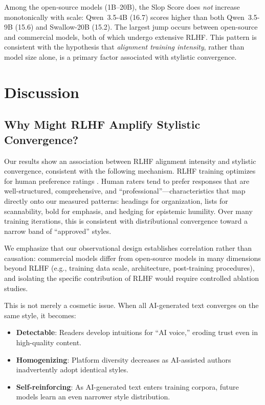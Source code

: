 \documentclass[11pt,a4paper]{article}
\begin{document}
Among the open-source models (1B--20B), the Slop Score does \textit{not} increase monotonically with scale: Qwen~3.5-4B (16.7) scores higher than both Qwen~3.5-9B (15.6) and Swallow-20B (15.2). The largest jump occurs between open-source and commercial models, both of which undergo extensive RLHF. This pattern is consistent with the hypothesis that \textit{alignment training intensity}, rather than model size alone, is a primary factor associated with stylistic convergence.

\section{Discussion}

\subsection{Why Might RLHF Amplify Stylistic Convergence?}

Our results show an association between RLHF alignment intensity and stylistic convergence, consistent with the following mechanism. RLHF training optimizes for human preference ratings \cite{ouyang2022}. Human raters tend to prefer responses that are well-structured, comprehensive, and ``professional''---characteristics that map directly onto our measured patterns: headings for organization, lists for scannability, bold for emphasis, and hedging for epistemic humility. Over many training iterations, this is consistent with distributional convergence \cite{bommasani2021} toward a narrow band of ``approved'' styles.

We emphasize that our observational design establishes correlation rather than causation: commercial models differ from open-source models in many dimensions beyond RLHF (e.g., training data scale, architecture, post-training procedures), and isolating the specific contribution of RLHF would require controlled ablation studies.

This is not merely a cosmetic issue. When all AI-generated text converges on the same style, it becomes:
\begin{itemize}
    \item \textbf{Detectable}: Readers develop intuitions for ``AI voice,'' eroding trust even in high-quality content.
    \item \textbf{Homogenizing}: Platform diversity decreases as AI-assisted authors inadvertently adopt identical styles.
    \item \textbf{Self-reinforcing}: As AI-generated text enters training corpora, future models learn an even narrower style distribution.
\end{itemize}
\end{document}
